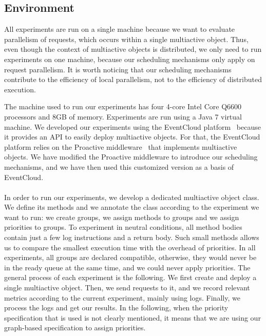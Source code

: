 \documentclass[11pt]{report}
\begin{document}
\subsection{Environment}
All experiments are run on a single machine because we want to evaluate parallelism of requests, which occurs within a single multiactive object. Thus, even though the context of multiactive objects is distributed, we only need to run experiments on one machine, because our scheduling mechanisms only apply on request parallelism. It is worth noticing that our scheduling mechanisms contribute to the efficiency of local parallelism, not to the efficiency of distributed execution.

The machine used to run our experiments has four 4-core Intel Core Q6600 processors and 8GB of memory. Experiments are run using a Java 7 virtual machine.
We developed our experiments using the EventCloud platform~\cite{ref:eventcloud} because it provides an API to easily deploy multiactive objects. For that, the EventCloud platform relies on the Proactive middleware~\cite{ref:proactive} that implements multiactive objects. We have modified the Proactive middleware to introduce our scheduling mechanisms, and we have then used this customized version as a basis of EventCloud.

\paragraph{}
In order to run our experiments, we develop a dedicated multiactive object class. We define its methods and we annotate the class according to the experiment we want to run: we create groups, we assign methods to groups and we assign priorities to groups. To experiment in neutral conditions, all method bodies contain just a few log instructions and a return body. Such small methods allows us to compare the smallest execution time with the overhead of priorities. 
In all experiments, all groups are declared compatible, otherwise, they would never be in the ready queue at the same time, and we could never apply priorities. The general process of each experiment is the following. We first create and deploy a single multiactive object. Then, we send requests to it, and we record relevant metrics according to the current experiment, mainly using logs. Finally, we process the logs and get our results.
In the following, when the priority specification that is used is not clearly mentioned, it means that we are using our graph-based specification to assign priorities.
\end{document}
